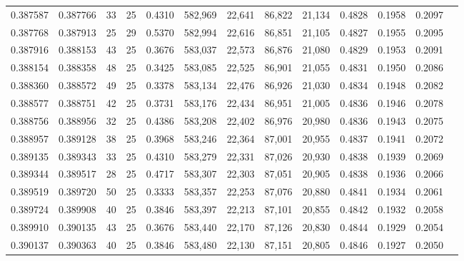 \begin{tabular}{rrrrrrrrrrrrr}
0.387587 & 0.387766 &    33 &  25 &                                     0.4310 & 582,969 &  22,641 &  86,822 &  21,134 & 0.4828 & 0.1958 & 0.2097 \\
0.387768 & 0.387913 &    25 &  29 &                                     0.5370 & 582,994 &  22,616 &  86,851 &  21,105 & 0.4827 & 0.1955 & 0.2095 \\
0.387916 & 0.388153 &    43 &  25 &                                     0.3676 & 583,037 &  22,573 &  86,876 &  21,080 & 0.4829 & 0.1953 & 0.2091 \\
0.388154 & 0.388358 &    48 &  25 &                                     0.3425 & 583,085 &  22,525 &  86,901 &  21,055 & 0.4831 & 0.1950 & 0.2086 \\
0.388360 & 0.388572 &    49 &  25 &                                     0.3378 & 583,134 &  22,476 &  86,926 &  21,030 & 0.4834 & 0.1948 & 0.2082 \\
0.388577 & 0.388751 &    42 &  25 &                                     0.3731 & 583,176 &  22,434 &  86,951 &  21,005 & 0.4836 & 0.1946 & 0.2078 \\
0.388756 & 0.388956 &    32 &  25 &                                     0.4386 & 583,208 &  22,402 &  86,976 &  20,980 & 0.4836 & 0.1943 & 0.2075 \\
0.388957 & 0.389128 &    38 &  25 &                                     0.3968 & 583,246 &  22,364 &  87,001 &  20,955 & 0.4837 & 0.1941 & 0.2072 \\
0.389135 & 0.389343 &    33 &  25 &                                     0.4310 & 583,279 &  22,331 &  87,026 &  20,930 & 0.4838 & 0.1939 & 0.2069 \\
0.389344 & 0.389517 &    28 &  25 &                                     0.4717 & 583,307 &  22,303 &  87,051 &  20,905 & 0.4838 & 0.1936 & 0.2066 \\
0.389519 & 0.389720 &    50 &  25 &                                     0.3333 & 583,357 &  22,253 &  87,076 &  20,880 & 0.4841 & 0.1934 & 0.2061 \\
0.389724 & 0.389908 &    40 &  25 &                                     0.3846 & 583,397 &  22,213 &  87,101 &  20,855 & 0.4842 & 0.1932 & 0.2058 \\
0.389910 & 0.390135 &    43 &  25 &                                     0.3676 & 583,440 &  22,170 &  87,126 &  20,830 & 0.4844 & 0.1929 & 0.2054 \\
0.390137 & 0.390363 &    40 &  25 &                                     0.3846 & 583,480 &  22,130 &  87,151 &  20,805 & 0.4846 & 0.1927 & 0.2050 \\

\end{tabular}
